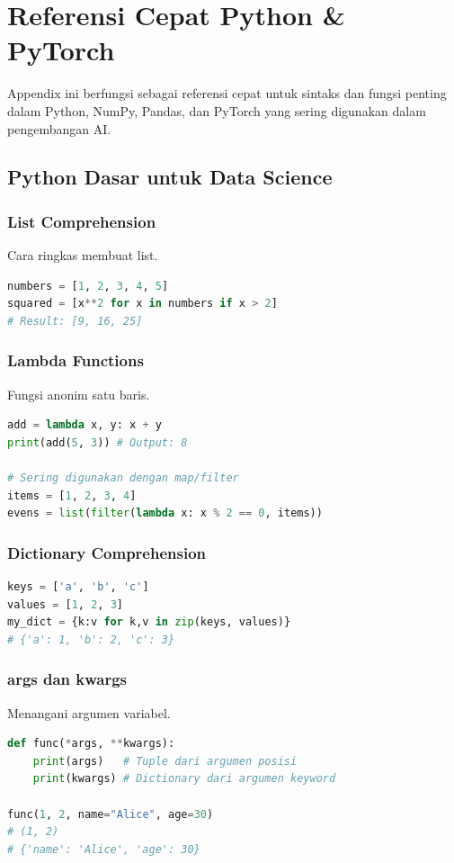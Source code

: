 \chapter{Referensi Cepat Python \& PyTorch}
\label{chap:python_ref}

Appendix ini berfungsi sebagai referensi cepat untuk sintaks dan fungsi penting dalam Python, NumPy, Pandas, dan PyTorch yang sering digunakan dalam pengembangan AI.

\section{Python Dasar untuk Data Science}

\subsection{List Comprehension}
Cara ringkas membuat list.
\begin{lstlisting}[language=Python]
numbers = [1, 2, 3, 4, 5]
squared = [x**2 for x in numbers if x > 2]
# Result: [9, 16, 25]
\end{lstlisting}

\subsection{Lambda Functions}
Fungsi anonim satu baris.
\begin{lstlisting}[language=Python]
add = lambda x, y: x + y
print(add(5, 3)) # Output: 8

# Sering digunakan dengan map/filter
items = [1, 2, 3, 4]
evens = list(filter(lambda x: x % 2 == 0, items))
\end{lstlisting}

\subsection{Dictionary Comprehension}
\begin{lstlisting}[language=Python]
keys = ['a', 'b', 'c']
values = [1, 2, 3]
my_dict = {k:v for k,v in zip(keys, values)}
# {'a': 1, 'b': 2, 'c': 3}
\end{lstlisting}

\subsection{args dan kwargs}
Menangani argumen variabel.
\begin{lstlisting}[language=Python]
def func(*args, **kwargs):
    print(args)   # Tuple dari argumen posisi
    print(kwargs) # Dictionary dari argumen keyword

func(1, 2, name="Alice", age=30)
# (1, 2)
# {'name': 'Alice', 'age': 30}
\end{lstlisting}

